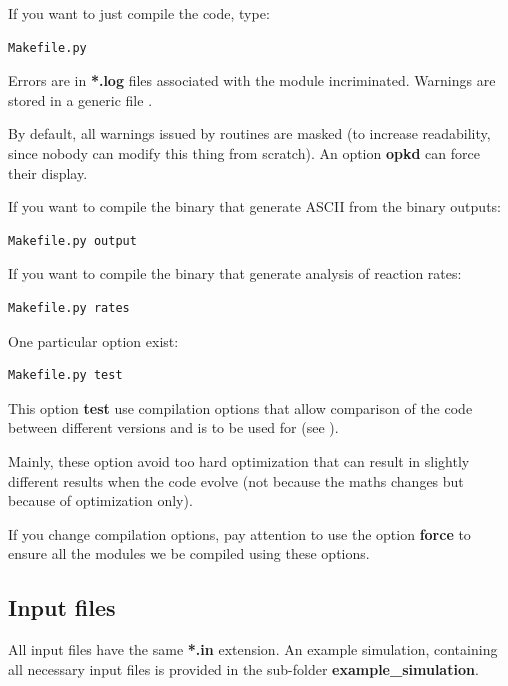 \documentclass[english,a4paper,twoside]{article}
\begin{document}
If you want to just compile the code, type:
\begin{verbatim}
Makefile.py
\end{verbatim}

\begin{remarque}
Errors are in \textbf{*.log} files associated with the module incriminated. Warnings are stored in a generic file .
\end{remarque}

\begin{attention}
By default, all warnings issued by  routines are masked (to increase readability, since nobody can modify this thing from scratch). An option \textbf{opkd} can force their display.
\end{attention}

If you want to compile the binary  that generate ASCII from the binary outputs:
\begin{verbatim}
Makefile.py output
\end{verbatim}

If you want to compile the binary  that generate analysis of reaction rates:
\begin{verbatim}
Makefile.py rates
\end{verbatim}

\bigskip

One particular option exist:
\begin{verbatim}
Makefile.py test
\end{verbatim}
This option \textbf{test} use compilation options that allow comparison of the code between different versions and is to be used for  (see ). 

\begin{remarque}
Mainly, these option avoid too hard optimization that can result in slightly different results when the code evolve (not because the maths changes but because of optimization only).

If you change compilation options, pay attention to use the option \textbf{force} to ensure all the modules we be compiled using these options.
\end{remarque}

\subsection{Input files}\label{sec:input-files}
All input files have the same \textbf{*.in} extension. An example simulation, containing all necessary input files is provided in the sub-folder \textbf{example\_simulation}.
\end{document}
